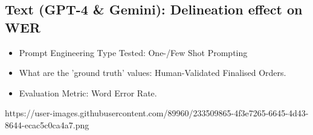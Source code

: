 
\subsection{Text (GPT-4 \& Gemini): Delineation effect on WER}

\begin{itemize}
    \item Prompt Engineering Type Tested:  One-/Few Shot Prompting
    \item What are the 'ground truth' values: Human-Validated Finalised Orders.
    \item Evaluation Metric: Word Error Rate.
\end{itemize}
https://user-images.githubusercontent.com/89960/233509865-4f3e7265-6645-4d43-8644-ecac5c0ca4a7.png